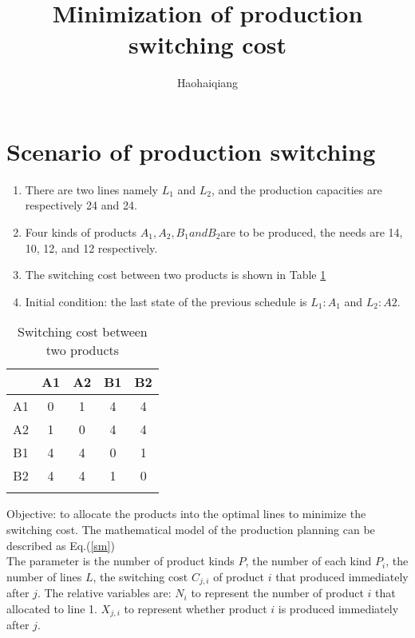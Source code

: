 \documentclass{article}
\author{Haohaiqiang}
\title{Minimization of production switching cost} %
\newcommand{\myref}[1]{Eq.(\ref{#1})}
\begin{document}
	\maketitle
	\section{Scenario of production switching}
	\begin{enumerate}[(1)]
		\item There are two lines namely $ L_1 $ and $ L_2 $, and the production capacities are respectively 24 and 24.\\
		\item Four kinds  of products $ A_1, A_2, B_1 and B_2 $are to be produced, the needs are 14, 10, 12, and 12 respectively. \\
		\item The switching cost between two products is shown in Table \ref{sc}\\
		\item Initial condition: the last state of the previous schedule is $ L_1:A_1 $ and $ L_2:A2 $.
	\end{enumerate}
	\begin{table}
		\centering
		\caption{Switching cost between two products}
		\begin{tabular}{*{5}{c}} 
		\toprule
		& A1 & A2 & B1 & B2 \\
		\midrule
		A1& 0 & 1 & 4 & 4 \\
		
		A2& 1 & 0 & 4 & 4 \\
		
		B1& 4 & 4 & 0 & 1 \\
		
		B2& 4 & 4 & 1 & 0 \\
		\bottomrule
		\label{sc}
		\end{tabular}
	\end{table}
	Objective: to allocate the products into the optimal lines to minimize the switching cost. The mathematical model of the production planning can be described as \myref{sm}\\ The parameter is the number of product kinds $ P $, the number of each kind $ P_i $, the number of lines $ L $, the switching cost $ C_{j,i} $ of product $ i $ that produced immediately after $ j $.
	The relative variables are: $ N_i $ to represent the number of product $ i $ that allocated to line 1. $ X_{j,i} $ to represent whether product $ i $ is produced immediately after $ j $.
\end{document}
